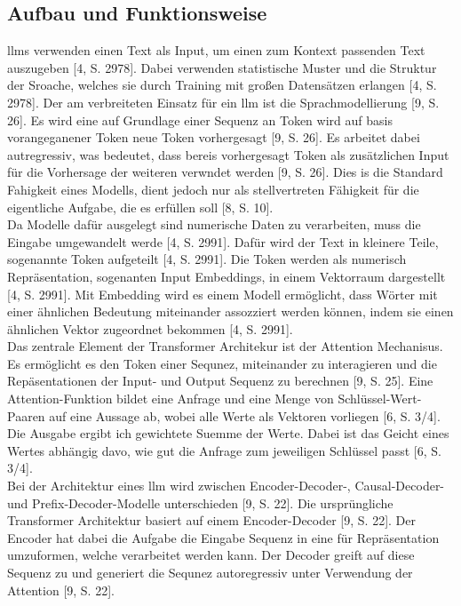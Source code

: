 \subsection{Aufbau und Funktionsweise}

\acp{llm} verwenden einen Text als Input, um einen zum Kontext passenden Text auszugeben [4, S. 2978]. Dabei verwenden statistische Muster und die Struktur der 
Sroache, welches sie durch Training mit großen Datensätzen erlangen [4, S. 2978]. Der am verbreiteten Einsatz für ein \ac{llm} ist die Sprachmodellierung [9, S. 26].
Es wird eine auf Grundlage einer Sequenz an Token wird auf basis vorangeganener Token neue Token vorhergesagt [9, S. 26]. Es arbeitet dabei autregressiv, was bedeutet,
dass bereis vorhergesagt Token als zusätzlichen Input für die Vorhersage der weiteren verwndet werden [9, S. 26]. Dies is die Standard Fahigkeit eines Modells, 
dient jedoch nur als stellvertreten Fähigkeit für die eigentliche Aufgabe, die es erfüllen soll [8, S. 10]. \\
Da Modelle dafür ausgelegt sind numerische Daten zu verarbeiten, muss die Eingabe umgewandelt werde  [4, S. 2991]. Dafür wird der Text in kleinere Teile, sogenannte
Token aufgeteilt [4, S. 2991]. Die Token werden als numerisch Repräsentation, sogenanten Input Embeddings, in einem Vektorraum dargestellt [4, S. 2991]. Mit 
Embedding wird es einem Modell ermöglicht, dass Wörter mit einer ähnlichen Bedeutung miteinander assozziert werden können, indem sie einen ähnlichen 
Vektor zugeordnet bekommen [4, S. 2991]. \\
Das zentrale Element der Transformer Architekur ist der Attention Mechanisus. Es ermöglicht es den Token einer Sequnez, miteinander zu interagieren und die 
Repäsentationen der Input- und Output Sequenz zu berechnen [9, S. 25]. Eine Attention-Funktion bildet eine Anfrage und eine Menge von Schlüssel-Wert-Paaren auf 
eine Aussage ab, wobei alle Werte als Vektoren vorliegen [6, S. 3/4]. Die Ausgabe ergibt ich gewichtete Suemme der Werte. Dabei ist das Geicht eines Wertes abhängig
davo, wie gut die Anfrage zum jeweiligen Schlüssel passt [6, S. 3/4]. \\
Bei der Architektur eines \ac{llm} wird zwischen Encoder-Decoder-, Causal-Decoder- und Prefix-Decoder-Modelle unterschieden [9, S. 22]. Die ursprüngliche 
Transformer Architektur basiert auf einem Encoder-Decoder [9, S. 22]. Der Encoder hat dabei die Aufgabe die Eingabe Sequenz in eine für Repräsentation 
umzuformen, welche verarbeitet werden kann. Der Decoder greift auf diese Sequenz zu und generiert die Sequnez autoregressiv unter Verwendung der Attention [9, S. 22].
